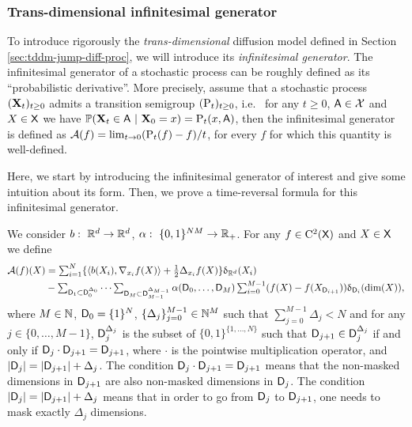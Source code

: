 \subsubsection{Trans-dimensional infinitesimal generator}

To introduce rigorously the \emph{trans-dimensional} diffusion model defined in
Section \ref{sec:tddm-jump-diff-proc}, we will introduce its \emph{infinitesimal
  generator}. The infinitesimal generator of a stochastic process can be roughly
defined as its ``probabilistic derivative''. More precisely, assume that a
stochastic process $(\mathbf{X}_t)_{t \geq 0}$ admits a transition semigroup
$(\mathrm{P}_t)_{t \geq 0}$, i.e.~ for any $t \geq 0$, $\mathsf{A} \in \mathcal{X}$ and
$X \in \mathsf{X}$ we have
$\mathbb{P}(\mathbf{X}_t \in \mathsf{A} \ | \ \mathbf{X}_0 = x) = \mathrm{P}_t(x, \mathsf{A})$, then the
infinitesimal generator is defined as
${\mathcal{A}}(f) = \lim_{t \to 0} (\mathrm{P}_t(f) - f)/t$, for every $f$ for which this
quantity is well-defined.

Here, we start by introducing the infinitesimal generator of interest and give
some intuition about its form. Then, we prove a time-reversal formula for this
infinitesimal generator. 

We consider $b: \ \mathbb{R}^d \to \mathbb{R}^d$, $\alpha: \ \{0,1\}^{NM} \to \mathbb{R}_+$. 
For any $f \in \mathrm{C}^2(\mathsf{X})$ and $X \in \mathsf{X}$ we define
\begin{align}
  \label{eq:definition_generator}
  {\mathcal{A}}(f)(X) &\textstyle= \sum_{i=1}^N \{ \langle b(X_i), \nabla_{x_i}f(X) \rangle + \tfrac{1}{2} \Delta_{x_i}f(X)\} \updelta_{\mathbb{R}^d}(X_i) \\
  & -\textstyle \sum_{\mathsf{D}_1 \subset \mathsf{D}_0^{\Delta_0}} \dots  \sum_{\mathsf{D}_M \subset \mathsf{D}_{M-1}^{\Delta_{M-1}}} \alpha(\mathsf{D}_0, \dots, \mathsf{D}_M) \sum_{i=0}^{M-1} (f(X) - f(X_{\mathsf{D}_{i+1}})) \updelta_{\mathsf{D}_i}(\mathrm{dim}(X)) ,
\end{align}
where $M \in \mathbb{N}$, $\mathsf{D}_0 = \{1\}^N$,
$\{\Delta_j\}_{j=0}^{M-1} \in \mathbb{N}^{M}$ such that
$\sum_{j=0}^{M-1} \Delta_j < N$ and for any $j \in \{0, \dots, M-1\}$,
$\mathsf{D}_j^{\Delta_j}$ is the subset of $\{0,1\}^{\{1, \dots, N\}}$ such that
$\mathsf{D}_{j+1} \in \mathsf{D}_j^{\Delta_j}$ if and only if
$\mathsf{D}_j \cdot \mathsf{D}_{j+1} = \mathsf{D}_{j+1}$, where $\cdot$ is the pointwise
multiplication operator, and $|\mathsf{D}_j| = |\mathsf{D}_{j+1}| + \Delta_j$. The condition
$\mathsf{D}_j \cdot \mathsf{D}_{j+1} = \mathsf{D}_{j+1}$ means that the non-masked dimensions in
$\mathsf{D}_{j+1}$ are also non-masked dimensions in $\mathsf{D}_j$. The condition
$|\mathsf{D}_j| = |\mathsf{D}_{j+1}| + \Delta_j$ means that in order to go from $\mathsf{D}_j$ to
$\mathsf{D}_{j+1}$, one needs to mask exactly $\Delta_j$ dimensions.

